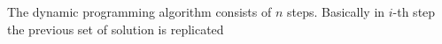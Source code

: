 

The dynamic programming algorithm consists of $n$ steps.
Basically in $i$-th step the previous set of solution is replicated



\cite{bazgan2009}



